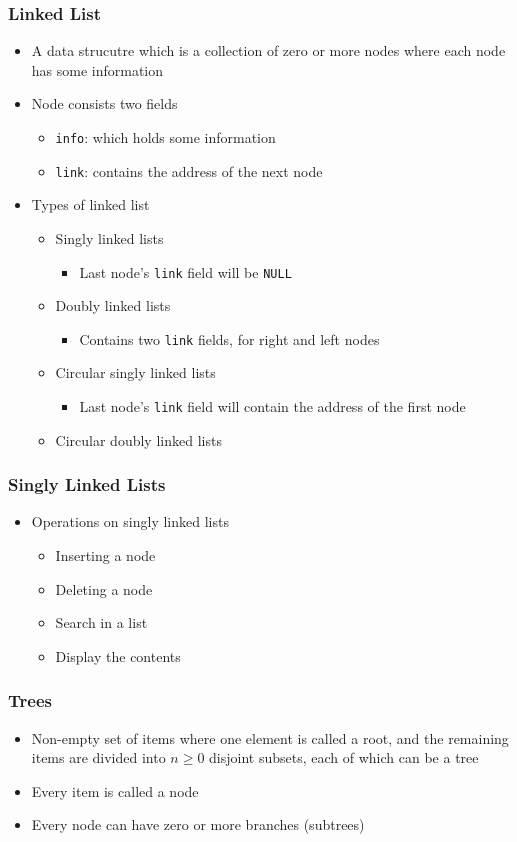 \documentclass[11pt]{beamer}
\begin{document}
\begin{frame}[fragile]\frametitle{Linked List}
\label{sec-1-27}

\begin{itemize}
\item A data strucutre which is a collection of zero or more nodes where each node has some information
\item Node consists two fields
\begin{itemize}
\item \verb~info~: which holds some information
\item \verb~link~: contains the address of the next node
\end{itemize}
\item Types of linked list
\begin{itemize}
\item Singly linked lists
\begin{itemize}
\item Last node's \verb~link~ field will be \verb~NULL~
\end{itemize}
\item Doubly linked lists
\begin{itemize}
\item Contains two \verb~link~ fields, for right and left nodes
\end{itemize}
\item Circular singly linked lists
\begin{itemize}
\item Last node's \verb~link~ field will contain the address of the first node
\end{itemize}
\item Circular doubly linked lists
\end{itemize}
\end{itemize}
\end{frame}
\begin{frame}[fragile]\frametitle{Singly Linked Lists}
\label{sec-1-28}

\begin{itemize}
\item Operations on singly linked lists
\begin{itemize}
\item Inserting a node
\item Deleting a node
\item Search in a list
\item Display the contents
\end{itemize}
\end{itemize}
\end{frame}
\begin{frame}[fragile]\frametitle{Trees}
\label{sec-1-29}

\begin{itemize}
\item Non-empty set of items where one element is called a root, and the remaining items are divided into $n\ge 0$ disjoint subsets,
  each of which can be a tree
\item Every item is called a node
\item Every node can have zero or more branches (subtrees)
\end{itemize}
\end{frame}
\end{document}
